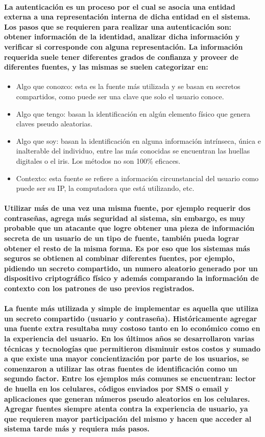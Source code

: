\documentclass{article}
\begin{document}
\paragraph{
La autenticación es un proceso por el cual se asocia una entidad externa a una representación interna de dicha entidad en el sistema. Los pasos que se requieren para realizar una autenticación son: obtener información de la identidad, analizar dicha información y verificar si corresponde con alguna representación. La información requerida suele tener diferentes grados de confianza y proveer de diferentes fuentes, y las mismas se suelen categorizar en:
}
\begin{itemize}
  \item Algo que conozco: esta es la fuente más utilizada y se basan en secretos compartidos, como puede ser una clave que solo el usuario conoce.
  \item Algo que tengo: basan la identificación en algún elemento físico que genera claves pseudo aleatorias.
  \item Algo que soy: basan la identificación en alguna información intrínseca, única e inalterable del individuo, entre las más conocidas se encuentran las huellas digitales o el iris. Los métodos no son 100\% eficaces.
  \item Contexto: esta fuente se refiere a información circunstancial del usuario como puede ser su IP, la computadora que está utilizando, etc.
\end{itemize}
\paragraph{
Utilizar más de una vez una misma fuente, por ejemplo requerir dos contraseñas, agrega más seguridad al sistema, sin embargo, es muy probable que un atacante que logre obtener una pieza de información secreta de un usuario de un tipo de fuente, también pueda lograr obtener el resto de la misma forma. Es por eso que los sistemas más seguros se obtienen al combinar diferentes fuentes, por ejemplo, pidiendo un secreto compartido, un numero aleatorio generado por un dispositivo criptográfico físico y además comparando la información de contexto con los patrones de uso previos registrados.
}
\paragraph{
La fuente más utilizada y simple de implementar es aquella que utiliza un secreto compartido (usuario y contraseña). Históricamente agregar una fuente extra resultaba muy costoso tanto en lo económico como en la experiencia del usuario. En los últimos años se desarrollaron varias técnicas y tecnologías que permitieron disminuir estos costos y sumado a que existe una mayor concientización por parte de los usuarios, se comenzaron a utilizar las otras fuentes de identificación como un segundo factor. Entre los ejemplos más comunes se encuentran: lector de huella en los celulares, códigos enviados por SMS o email y aplicaciones que generan números pseudo aleatorios en los celulares. Agregar fuentes siempre atenta contra la experiencia de usuario, ya que requieren mayor participación del mismo y hacen que acceder al sistema tarde más y requiera más pasos.
}
\end{document}
